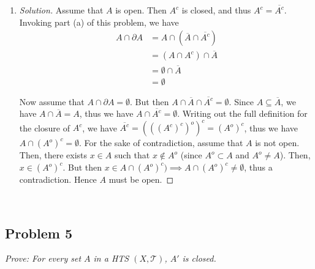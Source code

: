 \documentclass{article}
\begin{document}
\begin{enumerate}
\begin{proof}[Solution]
		Now assume that $\partial A \subseteq A$.
		From part (a) of this problem, we have
		$\partial A = \overline{A} \cap \overline{A^c} =
		\overline{A}\cap(((A^c)^c)^o)^c = \overline{A} \cap (A^o)^c
		= \overline{A} \setminus A^o$,
		thus $\partial A \cup A^o = \overline{A}$.
		Thus, since $\partial{A} \subseteq A$, by assumption,
		and $A^o \subseteq A$,
		we have $\overline{A} \subseteq A$.
		But $A \subseteq \overline{A}$ by definition,
		so $A = \overline{A}$.
		But this is true only $A$ is closed.
	\end{proof}
	\item \begin{proof}[Solution]\let\qed\relax
		Assume that $A$ is open.
		Then $A^c$ is closed, and thus $A^c = \overline{A^c}$.
		Invoking part (a) of this problem, we have
		\begin{align*}
			A \cap \partial A
			&= A \cap (\overline{A} \cap \overline{A^c})\\
			&= (A \cap A^c) \cap \overline{A}\\
			&= \emptyset \cap \overline{A}\\
			&= \emptyset
		\end{align*}

		Now assume that $A \cap \partial A = \emptyset$.
		But then $A \cap \overline{A} \cap \overline{A^c} = \emptyset$.
		Since $A \subseteq \overline{A}$, we have $A \cap \overline{A} = A$,
		thus we have $A \cap \overline{A^c} = \emptyset$.
		Writing out the full definition for the closure of $A^c$, we have
		$\overline{A^c} = (((A^c)^c)^o)^c = (A^o)^c$,
		thus we have $A \cap (A^o)^c = \emptyset$.
		For the sake of contradiction, assume that $A$ is not open.
		Then, there exists $x \in A$ such that $x \not \in A^o$
		(since $A^o \subset A$ and $A^o \neq A$).
		Then, $x \in (A^o)^c$.
		But then $x \in A \cap (A^o)^c) \implies A \cap (A^o)^c \neq \emptyset$,
		thus a contradiction.
		Hence $A$ must be open.
	\end{proof}
\end{enumerate}
\clearpage
~\clearpage

\subsection*{Problem 5}
{\it Prove: For every set $A$ in a HTS $(X, \mathcal{T})$, $A'$ is closed.}
\end{document}
